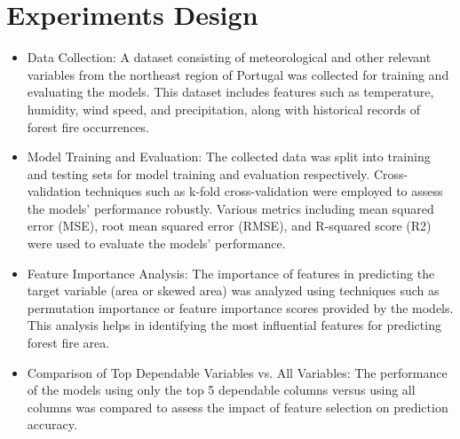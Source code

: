 \section {Experiments Design}
\begin{itemize}
\item Data Collection:
A dataset consisting of meteorological and other relevant variables from the northeast region of Portugal was collected for training and evaluating the models. This dataset includes features such as
temperature, humidity, wind speed, and precipitation, along with historical records of forest fire occurrences.

\item Model Training and Evaluation:
The collected data was split into training and testing sets for model training and evaluation respectively. Cross-validation techniques such as k-fold cross-validation were employed to assess
the models' performance robustly. Various metrics including mean squared error (MSE), root mean squared error (RMSE), and R-squared score (R2) were used to evaluate the models' performance.

\item Feature Importance Analysis:
The importance of features in predicting the target variable (area or skewed area) was analyzed using techniques such as permutation importance or feature importance scores provided by the models. This analysis helps in identifying the most influential features for predicting forest fire area.

\item Comparison of Top Dependable Variables vs. All Variables:
The performance of the models using only the top 5 dependable columns versus using all columns was compared to assess the impact of feature selection on prediction accuracy.
\end{itemize}